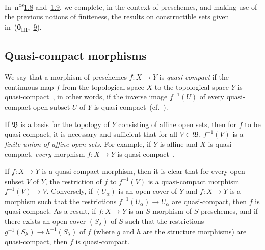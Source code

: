In~n\textsuperscript{os}{\hyperlink{ega4.c04.subsec.1-8}{1.8}} and~{\hyperlink{ega4.c04.subsec.1-9}{1.9}}, we complete, in the context of preschemes, and making use of the previous notions of finiteness, the results on constructible sets given in~(\textbf{0}\textsubscript{III},~\textsection\hyperref[section:0.9]{9}).

\subsection{Quasi-compact morphisms}
\label{subsection:IV.1.1}

\begin{definition}[1.1.1]
\label{IV.1.1.1}
We say that a morphism of preschemes $f:X\to Y$ is \emph{quasi-compact} if the continuous map $f$ from the topological space $X$ to the topological space $Y$ is quasi-compact~, in other words, if the inverse image $f^{-1}(U)$ of every quasi-compact open subset $U$ of $Y$ is quasi-compact~(cf.~).
\end{definition}

If $\mathfrak{B}$ is a basis for the topology of $Y$ consisting of affine open sets, then for $f$ to be quasi-compact, it is necessary and sufficient that for all $V\in\mathfrak{B}$, $f^{-1}(V)$ is a \emph{finite union of affine open sets}.
For example, if $Y$ is affine and $X$ is quasi-compact, \emph{every} morphism $f:X\to Y$ is quasi-compact~.

If $f:X\to Y$ is a quasi-compact morphism, then it is clear that for every open subset $V$ of $Y$, the restriction of $f$ to $f^{-1}(V)$ is a quasi-compact morphism $f^{-1}(V)\to V$.
Conversely, if $(U_\alpha)$ is an open cover of $Y$ and $f:X\to Y$ is a morphism such that the restrictions $f^{-1}(U_\alpha)\to U_\alpha$ are quasi-compact, then $f$ is quasi-compact.
As
a result, if $f:X\to Y$ is an $S$-morphism of $S$-preschemes, and if there exists an open cover $(S_\lambda)$ of $S$ such that the restrictions $g^{-1}(S_\lambda)\to h^{-1}(S_\lambda)$ of $f$ (where $g$ and $h$ are the structure morphisms) are quasi-compact, then $f$ is quasi-compact.

